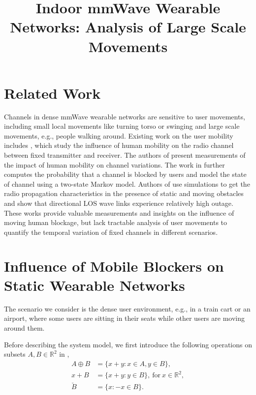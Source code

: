 \documentclass[10pt, conference, letterpaper]{IEEEtran}
\begin{document}
\title{Indoor mmWave Wearable Networks: Analysis of Large Scale Movements}

\author{
}

\maketitle

\section{Related Work}
Channels in dense mmWave wearable networks are sensitive to user movements, including small local movements like turning torso or swinging and large scale movements, e.g., people walking around. Existing work on the user mobility includes \cite{humanactivity}\cite{timevaryingpathshadowing}\cite{blockagein60ghz}, which study the influence of human mobility on the radio channel between fixed transmitter and receiver. 
The authors of \cite{humanactivity}\cite{timevaryingpathshadowing} present measurements of the impact of human mobility on channel variations. 
The work in \cite{timevaryingpathshadowing} further computes the probability that a channel is blocked by users and model the state of channel using a two-state Markov model. 
Authors of \cite{blockagein60ghz} use simulations to get the radio propagation characteristics in the presence of static and moving obstacles and show that directional LOS wave links experience relatively high outage. 
These works provide valuable measurements and insights on the influence of moving human blockage, but lack tractable analysis of user movements to quantify the temporal variation of fixed channels in different scenarios.

\section{Influence of Mobile Blockers on Static Wearable Networks}\label{section:largemobility}
The scenario we consider is the dense user environment, e.g., in a train cart or an airport, where some users are sitting in their seats while other users are moving around them. 

Before describing the system model, we first introduce the following operations on subsets $A, B\in \mathbb{R}^2$ in \cite{stochasticgeometry}, 
\begin{equation*}
\begin{split}
A \oplus B & = \{x+y:x\in A, y\in B\},\\
x + B & = \{x+y:y\in B\}, \mathrm{~for~} x\in \mathbb{R}^2, \\
\check{B} & = \{x: -x \in B\}.
\end{split}
\end{equation*}
\end{document}
